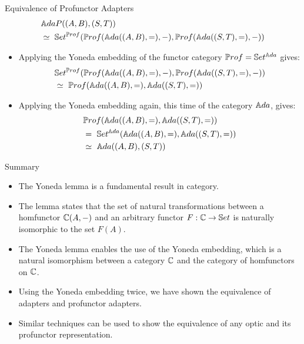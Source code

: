 \begin{frame}[fragile]{Equivalence of Profunctor Adapters}
	\begin{align*}
		&\mathbb{A}daP ((A,B),(S,T))\\
		&\simeq\ \mathbb{S}et^{{\mathbb{P}rof}}({\mathbb{P}rof}({\mathbb{A}da}((A, B), =), -), {\mathbb{P}rof}({\mathbb{A}da}((S, T), =), -))
	\end{align*}
	\vspace{-16pt}
	\begin{itemize}
		\item Applying the Yoneda embedding of the functor category ${\mathbb{P}rof} = \mathbb{S}et^{{\mathbb{A}da}}$ gives:
		\begin{align*}
			&\mathbb{S}et^{{\mathbb{P}rof}}({\mathbb{P}rof}({\mathbb{A}da}((A, B), =), -), {\mathbb{P}rof}({\mathbb{A}da}((S, T), =), -))\\ 
			&\simeq\  {\mathbb{P}rof}({\mathbb{A}da}((A,B), =), {\mathbb{A}da}((S,T), =))
		\end{align*}
		\item Applying the Yoneda embedding again, this time of the category ${\mathbb{A}da}$, gives:
		\begin{align*}
			&{\mathbb{P}rof}({\mathbb{A}da}((A,B), =), {\mathbb{A}da}((S,T), =))\\
			&=\ \mathbb{S}et^{\mathbb{A}da}({\mathbb{A}da}((A,B), =), {\mathbb{A}da}((S,T), =))\\
			&\simeq\ {\mathbb{A}da}((A,B), (S,T))
		\end{align*}
	\end{itemize}
\end{frame}
\begin{frame}{Summary}
	\begin{itemize}
		\item The Yoneda lemma is a fundamental result in category.
		\pause\item The lemma states that the set of natural transformations between a homfunctor $\mathbb{C}(A, -)$ and an arbitrary functor $F : \mathbb{C} \to \mathbb{S}et$ is naturally isomorphic to the set $F(A)$.
		\pause\item The Yoneda lemma enables the use of the Yoneda embedding, which is a natural isomorphism between a category $\mathbb{C}$ and the category of homfunctors on $\mathbb{C}$.
		\pause\item Using the Yoneda embedding twice, we have shown the equivalence of adapters and profunctor adapters.
		\pause\item Similar techniques can be used to show the equivalence of any optic and its profunctor representation.
	\end{itemize}
\end{frame}